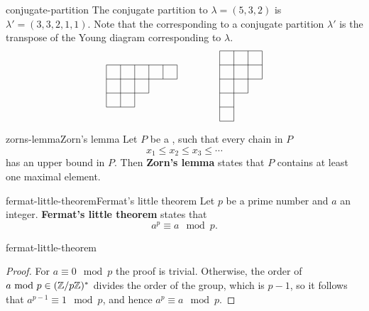 \begin{example}{conjugate-partition}
    The conjugate partition to $\lambda = (5, 3, 2)$ is $\lambda' = (3, 3, 2, 1, 1)$. Note that the  corresponding to a conjugate partition $\lambda'$ is the transpose of the Young diagram corresponding to $\lambda$.
    \[ \svg \begin{tikzpicture}
        \begin{scope}[scale=0.5]
            \draw (0, 3) -- (5, 3); \draw (0, 2) -- (5, 2); \draw (0, 1) -- (3, 1); \draw (0, 0) -- (2, 0); \draw (0, 3) -- (0, 0); \draw (1, 3) -- (1, 0); \draw (2, 3) -- (2, 0); \draw (3, 3) -- (3, 1); \draw (4, 3) -- (4, 2); \draw (5, 3) -- (5, 2);
        \end{scope}
        \begin{scope}[scale=0.5, shift={(8, -1)}]
            \draw (0, 5) -- (3, 5); \draw (0, 4) -- (3, 4); \draw (0, 3) -- (3, 3); \draw (0, 2) -- (2, 2); \draw (0, 1) -- (1, 1); \draw (0, 0) -- (1, 0); \draw (0, 0) -- (0, 5); \draw (1, 0) -- (1, 5); \draw (2, 2) -- (2, 5); \draw (3, 3) -- (3, 5);
        \end{scope}
    \end{tikzpicture}\]
\end{example}

\begin{topic}{zorns-lemma}{Zorn's lemma}
    Let $P$ be a , such that every chain in $P$
    \[ x_1 \le x_2 \le x_3 \le \cdots \]
    has an upper bound in $P$. Then \textbf{Zorn's lemma} states that $P$ contains at least one maximal element.
\end{topic}

\begin{topic}{fermat-little-theorem}{Fermat's little theorem}
    Let $p$ be a prime number and $a$ an integer. \textbf{Fermat's little theorem} states that
    \[ a^p \equiv a \mod p . \]
\end{topic}

\begin{example}{fermat-little-theorem}
    \begin{proof}
        For $a \equiv 0 \mod p$ the proof is trivial. Otherwise, the order of $a \textup{ mod } p \in (\mathbb{Z}/p\mathbb{Z})^*$ divides the order of the group, which is $p - 1$, so it follows that $a^{p - 1} \equiv 1 \mod p$, and hence $a^p \equiv a \mod p$.
    \end{proof}
\end{example}

